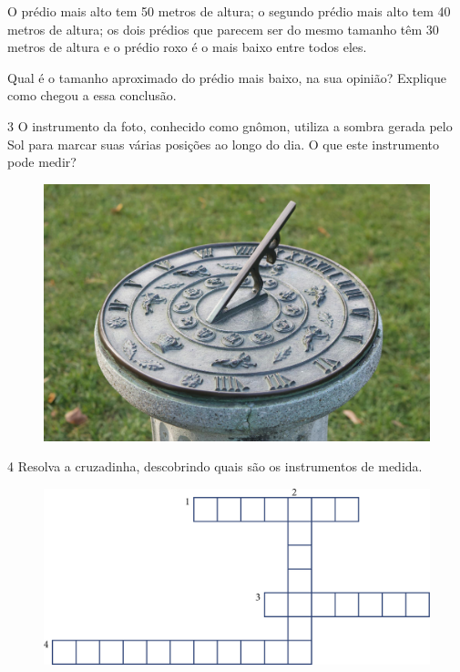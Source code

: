O prédio mais alto tem 50 metros de altura; o segundo prédio mais alto
tem 40 metros de altura; os dois prédios que parecem ser do mesmo
tamanho têm 30 metros de altura e o prédio roxo é o mais baixo entre
todos eles.

Qual é o tamanho aproximado do prédio mais baixo, na sua opinião?
Explique como chegou a essa conclusão.


\num{3} O instrumento da foto, conhecido como gnômon, utiliza a sombra
gerada pelo Sol para marcar suas várias posições ao longo do dia. O
que este instrumento pode medir?


\begin{figure}[htpb!]
\centering
\includegraphics[width=.5\textwidth]{./media/image33.png}
\end{figure}


\num{4} Resolva a cruzadinha, descobrindo quais são os instrumentos de medida.

\begin{figure}[H]
\centering
\includegraphics[scale=.74]{./media/image38.png}
\end{figure}

